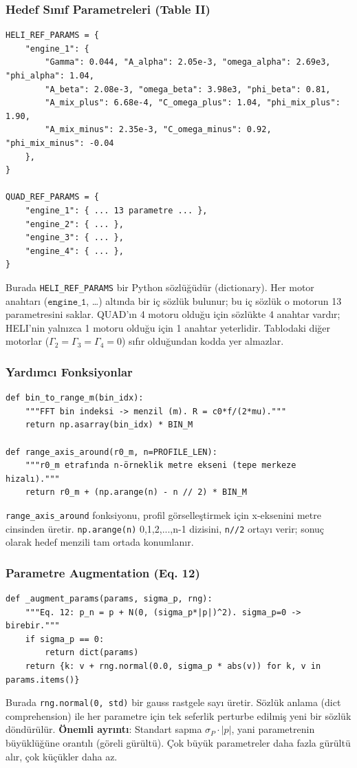 \documentclass[11pt,a4paper]{article}
\begin{document}
\subsubsection{Hedef Sınıf Parametreleri (Table II)}
\begin{lstlisting}[caption={HELI ve QUAD parametre sözlükleri}]
HELI_REF_PARAMS = {
    "engine_1": {
        "Gamma": 0.044, "A_alpha": 2.05e-3, "omega_alpha": 2.69e3, "phi_alpha": 1.04,
        "A_beta": 2.08e-3, "omega_beta": 3.98e3, "phi_beta": 0.81,
        "A_mix_plus": 6.68e-4, "C_omega_plus": 1.04, "phi_mix_plus": 1.90,
        "A_mix_minus": 2.35e-3, "C_omega_minus": 0.92, "phi_mix_minus": -0.04
    },
}

QUAD_REF_PARAMS = {
    "engine_1": { ... 13 parametre ... },
    "engine_2": { ... },
    "engine_3": { ... },
    "engine_4": { ... },
}
\end{lstlisting}
Burada \texttt{HELI\_REF\_PARAMS} bir Python sözlüğüdür (dictionary). Her motor anahtarı ($\texttt{engine\_1}$,
\ldots) altında bir iç sözlük bulunur; bu iç sözlük o motorun 13 parametresini saklar.
QUAD'ın 4 motoru olduğu için sözlükte 4 anahtar vardır; HELI'nin yalnızca 1 motoru olduğu için
1 anahtar yeterlidir. Tablodaki diğer motorlar ($\Gamma_2 = \Gamma_3 = \Gamma_4 = 0$) sıfır olduğundan kodda yer almazlar.

\subsubsection{Yardımcı Fonksiyonlar}
\begin{lstlisting}[caption={Bin-menzil dönüşümü ve eksen oluşturma}]
def bin_to_range_m(bin_idx):
    """FFT bin indeksi -> menzil (m). R = c0*f/(2*mu)."""
    return np.asarray(bin_idx) * BIN_M

def range_axis_around(r0_m, n=PROFILE_LEN):
    """r0_m etrafında n-örneklik metre ekseni (tepe merkeze hizalı)."""
    return r0_m + (np.arange(n) - n // 2) * BIN_M
\end{lstlisting}
\texttt{range\_axis\_around} fonksiyonu, profil görselleştirmek için x-eksenini metre cinsinden üretir.
\texttt{np.arange(n)} 0,1,2,...,n-1 dizisini, \texttt{n//2} ortayı verir; sonuç olarak hedef
menzili tam ortada konumlanır.

\subsubsection{Parametre Augmentation (Eq. 12)}
\begin{lstlisting}[caption={Augmentation fonksiyonu}]
def _augment_params(params, sigma_p, rng):
    """Eq. 12: p_n = p + N(0, (sigma_p*|p|)^2). sigma_p=0 -> birebir."""
    if sigma_p == 0:
        return dict(params)
    return {k: v + rng.normal(0.0, sigma_p * abs(v)) for k, v in params.items()}
\end{lstlisting}
Burada \texttt{rng.normal(0, std)} bir gauss rastgele sayı üretir. Sözlük anlama (dict comprehension)
ile her parametre için tek seferlik perturbe edilmiş yeni bir sözlük döndürülür.
\textbf{Önemli ayrıntı}: Standart sapma $\sigma_P \cdot |p|$, yani parametrenin büyüklüğüne orantılı
(göreli gürültü). Çok büyük parametreler daha fazla gürültü alır, çok küçükler daha az.
\end{document}
